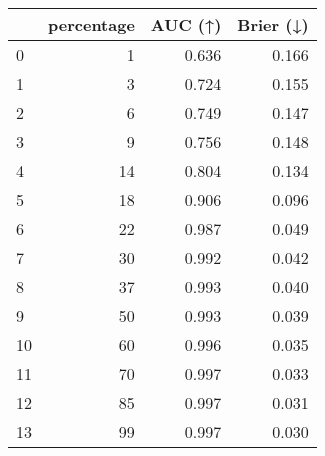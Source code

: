\begin{tabular}{lrrr}
\toprule
 & percentage & AUC (↑) & Brier (↓) \\
\midrule
0 & 1 & 0.636 & 0.166 \\
1 & 3 & 0.724 & 0.155 \\
2 & 6 & 0.749 & 0.147 \\
3 & 9 & 0.756 & 0.148 \\
4 & 14 & 0.804 & 0.134 \\
5 & 18 & 0.906 & 0.096 \\
6 & 22 & 0.987 & 0.049 \\
7 & 30 & 0.992 & 0.042 \\
8 & 37 & 0.993 & 0.040 \\
9 & 50 & 0.993 & 0.039 \\
10 & 60 & 0.996 & 0.035 \\
11 & 70 & 0.997 & 0.033 \\
12 & 85 & 0.997 & 0.031 \\
13 & 99 & 0.997 & 0.030 \\
\bottomrule
\end{tabular}
